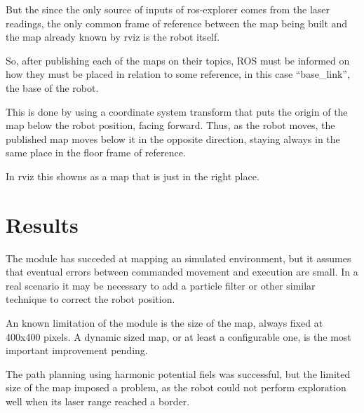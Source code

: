 \documentclass[a4paper,twocolumn]{article}
\begin{document}
    But the since the only source of inputs of ros-explorer comes from the laser readings, the only common frame of reference between the map being built and the map already known by rviz is the robot itself.

    So, after publishing each of the maps on their topics, ROS must be informed on how they must be placed in relation to some reference, in this case ``base\_link'', the base of the robot.

    This is done by using a coordinate system transform that puts the origin of the map below the robot position, facing forward. Thus, as the robot moves, the published map moves below it in the opposite direction, staying always in the same place in the floor frame of reference.
    
    In rviz this showns as a map that is just in the right place.

\section{Results}
    The module has succeded at mapping an simulated environment, but it assumes that eventual errors between commanded movement and execution are small. In a real scenario it may be necessary to add a particle filter or other similar technique to correct the robot position.

    An known limitation of the module is the size of the map, always fixed at 400x400 pixels. A dynamic sized map, or at least a configurable one, is the most important improvement pending.
    
    The path planning using harmonic potential fiels was successful, but the limited size of the map imposed a problem, as the robot could not perform exploration well when its laser range reached a border.



\end{document}
